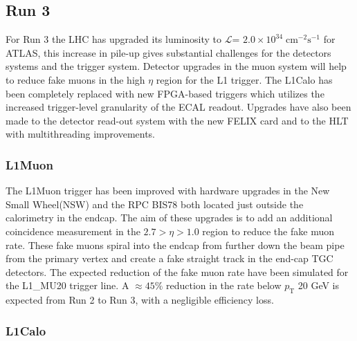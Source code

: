 
\subsection{Run 3}

For Run 3 the LHC has upgraded its luminosity to $\mathcal{L}$= $2.0\times10^{34} \; \text{cm}^{-2}\text{s}^{-1}$ for ATLAS, this increase in pile-up gives substantial challenges for the detectors systems and the trigger system. Detector upgrades in the muon system will help to reduce fake muons in the high $\eta$ region for the L1 trigger. The L1Calo has been completely replaced with new FPGA-based triggers which utilizes the increased trigger-level granularity of the ECAL readout. Upgrades have also been made to the detector read-out system with the new FELIX card and to the HLT with multithreading improvements.

\subsubsection{L1Muon}

The L1Muon trigger has been improved with hardware upgrades in the New Small Wheel(NSW) and the RPC BIS78 both located just outside the calorimetry in the endcap. The aim of these upgrades is to add an additional coincidence measurement in the $2.7>\eta> 1.0 $ region to reduce the fake muon rate. These fake muons spiral into the endcap from further down the beam pipe from the primary vertex and create a fake straight track in the end-cap TGC detectors. The expected reduction of the fake muon rate have been simulated for the L1\_MU20 trigger line. A $\approx 45 \%$ reduction in the rate below $p_{\text{T}}$ 20 GeV is expected from Run 2 to Run 3, with a negligible efficiency loss\cite{Ventura:2841379}.
\subsubsection{L1Calo}

